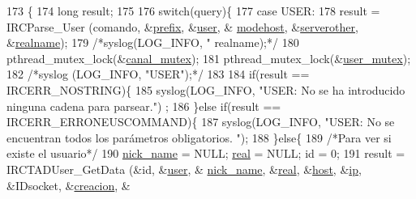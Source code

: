 \begin{DoxyCode}
173                                                               \{
174         \textcolor{keywordtype}{long} result;
175 
176         \textcolor{keywordflow}{switch}(query)\{
177                 \textcolor{keywordflow}{case} USER:
178                         result = IRCParse\_User (comando, &\hyperlink{_g-2361-06-_p1-_server_8c_ad2849cf781a4db22cc1b31eaaee50a4f}{prefix}, &\hyperlink{_g-2361-06-_p1-_server_8c_a14871705f45ccdc5bb9f4549efd8e119}{user}, &
      \hyperlink{_g-2361-06-_p1-_server_8c_a4f28f55d19ac069eabc38c224c3a4225}{modehost}, &\hyperlink{_g-2361-06-_p1-_server_8c_ae6eaaf28b08889a7ec2359f8968d796c}{serverother}, &\hyperlink{_g-2361-06-_p1-_server_8c_a980ab011cd3d327b370c042833f1dc08}{realname});
179                         \textcolor{comment}{/*syslog(LOG\_INFO, "%
       realname);*/}
180                         pthread\_mutex\_lock(&\hyperlink{_g-2361-06-_p1-_server_8c_ab86a544a49de18195048bac54dd3ac3e}{canal\_mutex});
181                         pthread\_mutex\_lock(&\hyperlink{_g-2361-06-_p1-_server_8c_a5dedd07a1144d2ab70b74a8e64b6a7c0}{user\_mutex});
182                         \textcolor{comment}{/*syslog (LOG\_INFO, "USER");*/}
183 
184                         \textcolor{keywordflow}{if}(result == IRCERR\_NOSTRING)\{
185                                 syslog(LOG\_INFO, \textcolor{stringliteral}{"USER: No se ha introducido ninguna cadena para parsear."})
      ;
186                         \}\textcolor{keywordflow}{else} \textcolor{keywordflow}{if}(result == IRCERR\_ERRONEUSCOMMAND)\{
187                                 syslog(LOG\_INFO, \textcolor{stringliteral}{"USER: No se encuentran todos los parámetros obligatorios.
      "});
188                         \}\textcolor{keywordflow}{else}\{
189                                 \textcolor{comment}{/*Para ver si existe el usuario*/}
190                                 \hyperlink{_g-2361-06-_p1-_server_8c_aabbf66718cda228b924a4a9441eadf62}{nick\_name} = NULL; \hyperlink{_g-2361-06-_p1-_server_8c_af832f551e1c343666c3d2a55834139a0}{real} = NULL; \textcolor{keywordtype}{id} = 0;
191                                 result = IRCTADUser\_GetData (&\textcolor{keywordtype}{id}, &\hyperlink{_g-2361-06-_p1-_server_8c_a14871705f45ccdc5bb9f4549efd8e119}{user}, &
      \hyperlink{_g-2361-06-_p1-_server_8c_aabbf66718cda228b924a4a9441eadf62}{nick\_name}, &\hyperlink{_g-2361-06-_p1-_server_8c_af832f551e1c343666c3d2a55834139a0}{real}, &\hyperlink{_g-2361-06-_p1-_server_8c_a1c2046dcb30a629d6d9f45ff8f403f12}{host}, &\hyperlink{_g-2361-06-_p1-_server_8c_afbc356cd0e25d1dbbece7c10fd025fa6}{ip}, &IDsocket, &\hyperlink{_g-2361-06-_p1-_server_8c_a26292066ca0d17922eadee4161542ab9}{creacion}, &

\end{DoxyCode}
